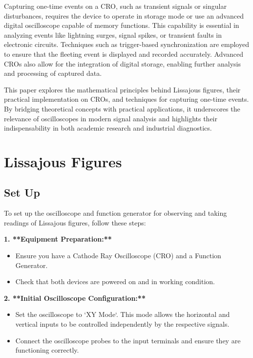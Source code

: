 \documentclass[12pt,a4paper]{report}
\begin{document}
Capturing one-time events on a CRO, such as transient signals or singular disturbances, requires the device to operate in storage mode or use an advanced digital oscilloscope capable of memory functions. This capability is essential in analyzing events like lightning surges, signal spikes, or transient faults in electronic circuits. Techniques such as trigger-based synchronization are employed to ensure that the fleeting event is displayed and recorded accurately. Advanced CROs also allow for the integration of digital storage, enabling further analysis and processing of captured data.

This paper explores the mathematical principles behind Lissajous figures, their practical implementation on CROs, and techniques for capturing one-time events. By bridging theoretical concepts with practical applications, it underscores the relevance of oscilloscopes in modern signal analysis and highlights their indispensability in both academic research and industrial diagnostics.


\tableofcontents



\listoffigures

\chapter{Lissajous Figures}
\section{Set Up}

To set up the oscilloscope and function generator for observing and taking readings of Lissajous figures, follow these steps:

 \textbf{1. **Equipment Preparation:**}
\begin{itemize}
    \item Ensure you have a Cathode Ray Oscilloscope (CRO) and a Function Generator.
   \item Check that both devices are powered on and in working condition.
\end{itemize}
 \textbf{2. **Initial Oscilloscope Configuration:**}
\begin{itemize}
    \item Set the oscilloscope to `XY Mode`. This mode allows the horizontal and vertical inputs to be controlled independently by the respective signals.
   \item Connect the oscilloscope probes to the input terminals and ensure they are functioning correctly.
\end{itemize}
\end{document}
